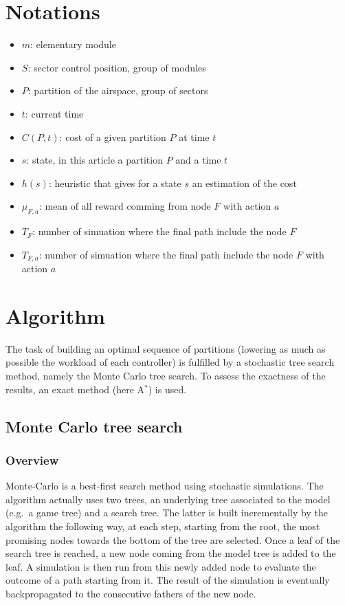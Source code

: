 \documentclass[twoside,twocolumn]{article}
\begin{document}
\section*{Notations}
\begin{itemize}
  \item $m$: elementary module
  \item $S$: sector control position, group of modules
  \item $P$: partition of the airspace, group of sectors
  \item $t$: current time
  \item $C(P, t)$: cost of a given partition $P$ at time $t$
  \item $s$: state, in this article a partition $P$ and a time $t$
  \item $h(s)$: heuristic that gives for a state $s$ an estimation of the cost
  \item $\mu_{F, a}$: mean of all reward comming from node $F$ with action $a$
  \item $T_F$: number of simuation where the final path include the node $F$
  \item $T_{F, a}$: number of simuation where the final path include the
    node $F$ with action $a$
\end{itemize}

\section{Algorithm}

The task of building an optimal sequence of partitions (lowering
as much as possible the workload of each controller) is fulfilled by a
stochastic tree search method, namely the Monte Carlo tree search. To assess the
exactness of the results, an exact method (here A\(^*\)) is used.

\subsection{Monte Carlo tree search}
\subsubsection{Overview}
Monte-Carlo is a best-first search method using stochastic simulations. The
algorithm actually uses two trees, an underlying tree associated to the model
(e.g.\ a game tree) and a search tree. The latter is built incrementally by the
algorithm the following way, at each step, starting from the root, the most
promising nodes towards the bottom of the tree are selected. Once a leaf of the
search tree is reached, a new node coming from the model tree is added to the
leaf. A simulation is then run from this newly added node to evaluate the
outcome of a path starting from it. The result of the simulation is eventually
backpropagated to the consecutive fathers of the new node.
\end{document}
